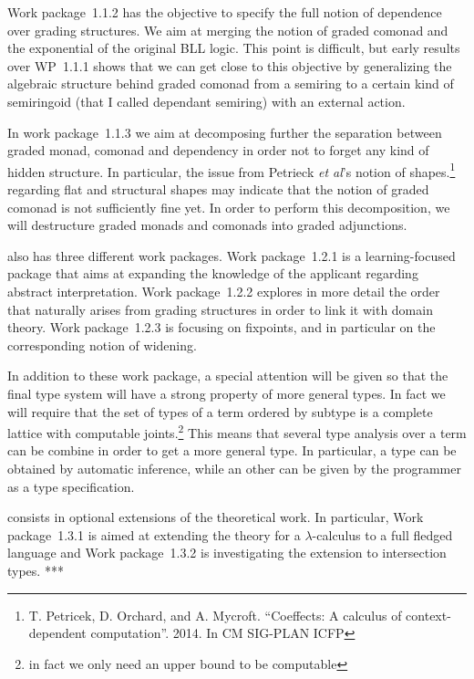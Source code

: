 \documentclass{article}[11pt]
\begin{document}
Work package~1.1.2 has the objective to specify the full notion of dependence over grading structures. We aim at merging the notion of graded comonad and the exponential of the original BLL logic. This point is difficult, but early results over WP~1.1.1 shows that we can get close to this objective by generalizing the algebraic structure behind graded comonad from a semiring to a certain kind of semiringoid (that I called dependant semiring) with an external action.

In work package~1.1.3 we aim at decomposing further the separation between graded monad, comonad and dependency in order not to forget any kind of hidden structure. In particular, the issue from Petrieck {\em et al}'s notion of shapes.\footnote{T. Petricek, D. Orchard, and A. Mycroft. ``Coeffects: A calculus of context-dependent computation''. 2014. In CM SIG-PLAN ICFP} regarding flat and structural shapes may indicate that the notion of graded comonad is not sufficiently fine yet. In order to perform this decomposition, we will destructure graded monads and comonads into graded adjunctions.

 also has three different work packages. Work package~1.2.1 is a learning-focused package that aims at expanding the knowledge of the applicant regarding abstract interpretation. %
Work package~1.2.2 explores in more detail the order that naturally arises from grading structures in order to link it with domain theory. Work package~1.2.3 is focusing on fixpoints, and in particular on the corresponding notion of widening.

In addition to these work package, a special attention will be given so that the final type system will have a strong property of more general types. In fact we will require that the set of types of a term ordered by subtype is a complete lattice with computable joints.\footnote{in fact we only need an upper bound to be computable} This means that several type analysis over a term can be combine in order to get a more general type. In particular, a type can be obtained by automatic inference, while an other can be given by the programmer as a type specification.


 consists in optional extensions of the theoretical work. In particular, Work package~1.3.1 is aimed at extending the theory for a $\lambda$-calculus to a full fledged language and Work package~1.3.2 is investigating the extension to intersection types. ***
\end{document}
